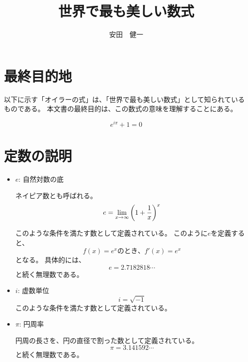 \documentclass[12pt,a4paper,fleqn]{ltjsarticle}
\begin{document}
\title{世界で最も美しい数式}
\author{安田　健一}
\maketitle

\section{最終目的地}
以下に示す{\Large 「オイラーの式」}は、「世界で最も美しい数式」として知られているものである。
本文書の最終目的は、この数式の意味を理解することにある。
\begin{spacing}{0.3}
{\Large
    \begin{equation}
        e^{i\pi} + 1 = 0 \tag{$*$}
    \end{equation}
}
\end{spacing}

\section{定数の説明}
\begin{itemize}
    \item {\Large $e$:}
    自然対数の底

    ネイピア数とも呼ばれる。
    \begin{equation*}
        e = \lim_{x \to \infty} \left( 1 + \frac{1}{x} \right) ^x \notag
    \end{equation*}

    このような条件を満たす数として定義されている。
    このように$e$を定義すると、
    \begin{equation*}
        f(x) = e^x のとき、
        f'(x) = e^x
    \end{equation*}
    となる。
    具体的には、
    \begin{equation*}
        e = 2.7182818\dotsb
    \end{equation*}
    と続く無理数である。

    \item {\Large $i$:}
    虚数単位
    \begin{equation*}
        i = \sqrt{-1}
    \end{equation*}
    このような条件を満たす数として定義されている。

  \item {\Large $\pi$:}
    円周率

    円周の長さを、円の直径で割った数として定義されている。
    \begin{equation*}
        \pi = 3.141592\dotsb
    \end{equation*}
    と続く無理数である。
\end{itemize}
\end{document}
